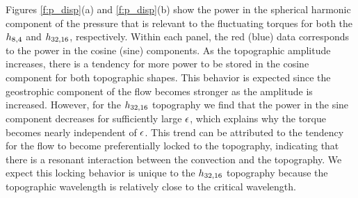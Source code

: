 Figures \ref{f:p_disp}(a) and \ref{f:p_disp}(b) show the power in the spherical harmonic component of the pressure that is relevant to the fluctuating torques for both the $h_{8,4}$ and $h_{32,16}$, respectively. Within each panel, the red (blue) data corresponds to the power in the cosine (sine) components. 
As the topographic amplitude increases, there is a tendency for more power to be stored in the cosine component for both topographic shapes. This behavior is expected since the geostrophic component of the flow becomes stronger as the amplitude is increased.
However, for the $h_{32,16}$ topography we find that the power in the sine component decreases for sufficiently large $\epsilon$, which explains why the torque becomes nearly independent of $\epsilon$.
This trend can be attributed to the tendency for the flow to become preferentially locked to the topography, indicating that there is a resonant interaction between the convection and the topography.
We expect this locking behavior is unique to the $h_{32,16}$ topography because the topographic wavelength is relatively close to the critical wavelength.





